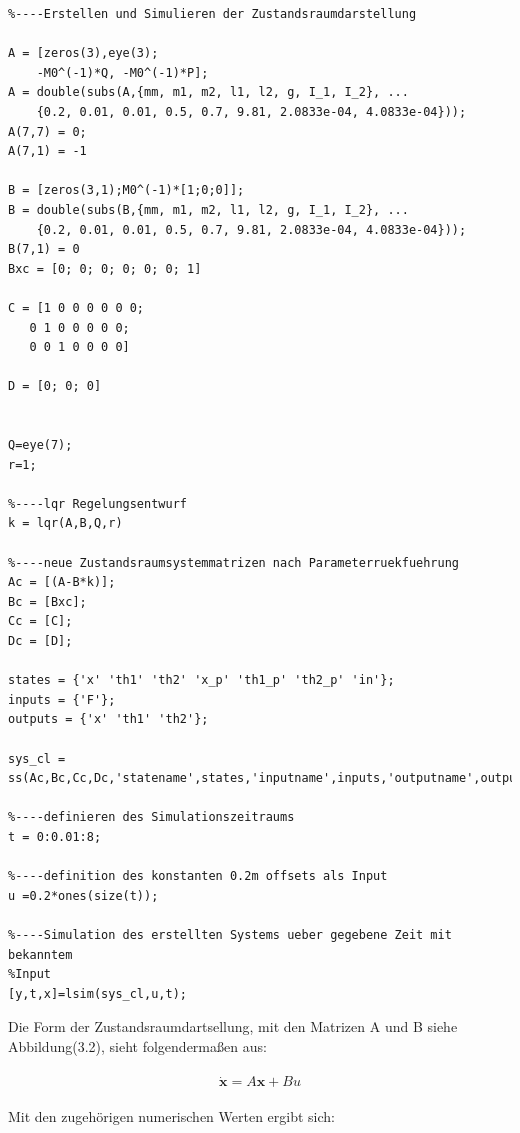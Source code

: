 \documentclass[a4paper, 10pt]{report}
\begin{document}
\begin{lstlisting}
%----Erstellen und Simulieren der Zustandsraumdarstellung

A = [zeros(3),eye(3);
    -M0^(-1)*Q, -M0^(-1)*P];
A = double(subs(A,{mm, m1, m2, l1, l2, g, I_1, I_2}, ...
    {0.2, 0.01, 0.01, 0.5, 0.7, 9.81, 2.0833e-04, 4.0833e-04}));
A(7,7) = 0;
A(7,1) = -1

B = [zeros(3,1);M0^(-1)*[1;0;0]];
B = double(subs(B,{mm, m1, m2, l1, l2, g, I_1, I_2}, ...
    {0.2, 0.01, 0.01, 0.5, 0.7, 9.81, 2.0833e-04, 4.0833e-04}));
B(7,1) = 0
Bxc = [0; 0; 0; 0; 0; 0; 1]

C = [1 0 0 0 0 0 0;
   0 1 0 0 0 0 0;
   0 0 1 0 0 0 0]

D = [0; 0; 0]


Q=eye(7);
r=1;

%----lqr Regelungsentwurf
k = lqr(A,B,Q,r)

%----neue Zustandsraumsystemmatrizen nach Parameterruekfuehrung
Ac = [(A-B*k)];
Bc = [Bxc];
Cc = [C];
Dc = [D];

states = {'x' 'th1' 'th2' 'x_p' 'th1_p' 'th2_p' 'in'};
inputs = {'F'};
outputs = {'x' 'th1' 'th2'};

sys_cl = ss(Ac,Bc,Cc,Dc,'statename',states,'inputname',inputs,'outputname',outputs);

%----definieren des Simulationszeitraums
t = 0:0.01:8;

%----definition des konstanten 0.2m offsets als Input
u =0.2*ones(size(t));

%----Simulation des erstellten Systems ueber gegebene Zeit mit bekanntem
%Input
[y,t,x]=lsim(sys_cl,u,t);
\end{lstlisting}
Die Form der Zustandsraumdartsellung, mit den Matrizen A und B siehe Abbildung(3.2), sieht folgendermaßen aus:\\\\
\begin{equation}
\label{eqn:Zustandraumdarstellung}
\mathbf{\dot{x}}=A \mathbf{x}+B u
\end{equation}
\\
Mit den zugehörigen numerischen Werten ergibt sich:
\\ \\
\end{document}
